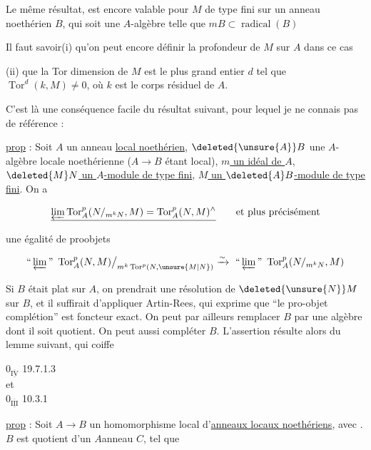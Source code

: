 

Le même résultat,  est encore valable pour $M$ de type fini sur un anneau  noethérien $B$, qui soit une $A$-algèbre telle que $mB\subset\operatorname{radical}(B)$

Il faut savoir\quad (i) qu'on peut encore définir la profondeur de $M$ sur $A$ dans ce cas

(ii) que la Tor dimension de $M$ est le plus grand entier $d$ tel que $\operatorname{Tor}^d(k,M)\ne0$, où $k$ est le corps résiduel de $A$.

C'est là une conséquence facile du résultat suivant, pour lequel je ne connais pas de référence :

\uline{prop} : Soit $A$ un anneau \uline{local noethérien}, $\deleted{\unsure{A}}B$ une $A$-algèbre locale noethérienne ($A\longrightarrow B$ étant local), \uline{$m$ un idéal de $A$}, \uline{$\deleted{M}N$ un $A$-module de type fini}, \uline{$M$ un $\deleted{A}B$-module de type fini}. On a

\[
\underline{\varprojlim\operatorname{Tor}^{p}_{A}(N/_{m^kN},M)=
\operatorname{Tor}^{p}_{A}(N,M)^{\wedge}}\qquad\text{et plus précisément}
\]

une égalité de proobjets

\[
\text{``}\varprojlim\text{''}\ \operatorname{Tor}^{p}_{A}(N,M)\big/_{m^k\operatorname{Tor}^{p}(N,\unsure{M|N})}
\xrightarrow{\sim}\ \text{``}\varprojlim\text{''}\ \operatorname{Tor}^{p}_{A}(N/_{m^kN},M)
\]

Si $B$ était plat sur $A$, on prendrait une résolution de $\deleted{\unsure{N}}M$ sur $B$, et il suffirait d'appliquer Artin-Rees, qui exprime que ``le pro-objet complétion'' est foncteur exact. On peut par ailleurs remplacer $B$ par une algèbre dont il soit quotient. On peut aussi compléter $B$. L'assertion résulte alors du lemme suivant, qui coiffe

$0_{\overline{\underline{\mathrm{IV}}}}$ 19.7.1.3\\
et\\
$0_{\overline{\underline{\mathrm{III}}}}$ 10.3.1

\uline{prop} : Soit $A\longrightarrow B$ un homomorphisme local d'\uline{anneaux locaux noethériens}, avec . $B$ est quotient d'un $A$anneau $C$, tel que


